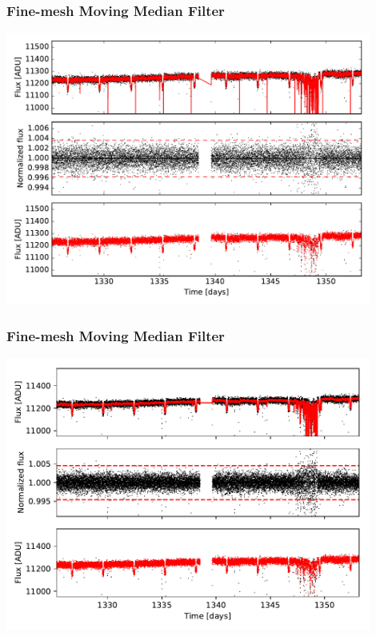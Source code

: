 \documentclass[notes]{beamer}
\begin{document}
\begin{frame}
\frametitle{Fine-mesh Moving Median Filter}
\centering
\includegraphics[width=0.9\textwidth]{../figures/2018-11-27_14:45:48_fine_mesh0.pdf}
\end{frame}

\begin{frame}
\frametitle{Fine-mesh Moving Median Filter}
\centering
\includegraphics[width=0.9\textwidth]{../figures/2019-1-15_11:5:15_finemesh_TIC38846515.pdf}
\end{frame}
\end{document}
